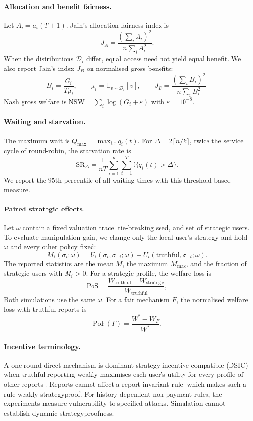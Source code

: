 \documentclass{article}
\begin{document}
\paragraph{Allocation and benefit fairness.}
Let $A_i=a_i(T+1)$. Jain's allocation-fairness index is
\cite{jain1984quantitative}
\[
  J_A=\frac{(\sum_i A_i)^2}{n\sum_i A_i^2}.
\]
When the distributions $\mathcal D_i$ differ, equal access need not yield
equal benefit. We also report Jain's index $J_B$ on normalised gross benefits:
\[
  B_i=\frac{G_i}{T\mu_i},\qquad
  \mu_i=\mathbb E_{v\sim\mathcal D_i}[v],\qquad
  J_B=\frac{(\sum_iB_i)^2}{n\sum_iB_i^2}.
\]
Nash gross welfare is
$\mathrm{NSW}=\sum_i\log(G_i+\varepsilon)$ with
$\varepsilon=10^{-8}$.

\paragraph{Waiting and starvation.}
The maximum wait is $Q_{\max}=\max_{i,t}q_i(t)$. For
$\Delta=2\lceil n/k\rceil$, twice the service cycle of round-robin, the
starvation rate is
\[
  \mathrm{SR}_{\Delta}
  =\frac{1}{nT}\sum_{i=1}^n\sum_{t=1}^T
    \mathbb I\{q_i(t)>\Delta\}.
\]
We report the $95$th percentile of all waiting times with this threshold-based
measure.

\paragraph{Paired strategic effects.}
Let $\omega$ contain a fixed valuation trace, tie-breaking seed, and set of
strategic users. To evaluate manipulation gain, we change only the focal user's
strategy and hold $\omega$ and every other policy fixed:
\[
  M_i(\sigma_i;\omega)
  =U_i(\sigma_i,\sigma_{-i};\omega)
   -U_i(\text{truthful},\sigma_{-i};\omega).
\]
The reported statistics are the mean $\overline M$, the maximum $M_{\max}$,
and the fraction of strategic users with $M_i>0$. For a strategic profile, the
welfare loss is
\[
  \mathrm{PoS}
  =\frac{W_{\mathrm{truthful}}-W_{\mathrm{strategic}}}
         {W_{\mathrm{truthful}}},
\]
Both simulations use the same $\omega$. For a fair mechanism $F$, the
normalised welfare loss with truthful reports is
\[
  \mathrm{PoF}(F)=\frac{W^*-W_F}{W^*}.
\]

\paragraph{Incentive terminology.}
A one-round direct mechanism is dominant-strategy incentive compatible (DSIC)
when truthful reporting weakly maximises each user's utility for every profile
of other reports \cite{nisan2007algorithmic}. Reports cannot affect a
report-invariant rule, which makes such a rule weakly strategyproof. For
history-dependent non-payment rules, the experiments measure vulnerability to
specified attacks. Simulation cannot establish dynamic strategyproofness.
\end{document}
